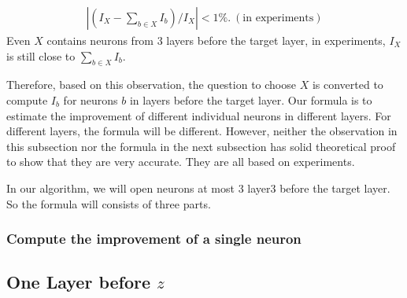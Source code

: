 \iffalse
That's why as far as we know, in competing heuristics to rank important nodes (e.g. \cite{BaB,huang2017safety,ferrari2022complete}), no call to solvers are made.
\fi










\iffalse
\begin{align*}
	|(I_X - \sum_{b\in X} I_b)/I_X| < 1\%. \ (\text{in experiments})
\end{align*} Even $X$ contains neurons from 3 layers before the target layer, in experiments, $I_X$ is still close to $\sum_{b\in X} I_b$.

Therefore, based on this observation, the question to choose $X$ is converted to compute $I_b$ for neurons $b$ in layers before the target layer. Our formula is to estimate the improvement of different individual neurons in different layers. For different layers, the formula will be different.  However, neither the observation in this subsection nor the formula in the next subsection has solid theoretical proof to show that they are very accurate. They are all based on experiments. 


In our algorithm, we will open neurons at most 3 layer3 before the target layer. So the formula will consists of three parts.


\subsubsection*{Compute the improvement of a single neuron}

\subsection*{One Layer before $z$}

